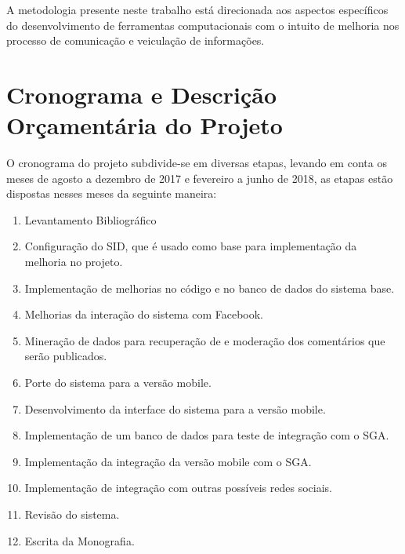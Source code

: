 \documentclass[
	12pt,				%
	openright,			%
	oneside,			%
	a4paper,			%
	english,			%
	french,				%
	spanish,			%
	brazil,				%
	]{abntex2}
\begin{document}
	A metodologia presente neste trabalho está direcionada aos aspectos específicos	do desenvolvimento de ferramentas computacionais com o intuito de melhoria nos processo de comunicação e veiculação de informações.
	
\section*{Cronograma e Descrição Orçamentária do Projeto}
	 O cronograma do projeto subdivide-se em diversas etapas, levando em conta os meses de agosto a dezembro de 2017 e fevereiro a junho de 2018, as etapas estão dispostas nesses meses da seguinte maneira:

	\begin{enumerate}[label=\Roman*)]
	\item Levantamento Bibliográfico
	
	\item Configuração do SID, que é usado como base para implementação da melhoria no projeto.
	
	\item Implementação de melhorias no código e no banco de dados do sistema base.
	
	\item Melhorias da interação do sistema com Facebook.
	
	\item Mineração de dados para recuperação de e moderação dos comentários que serão publicados.
	
	\item Porte do sistema para a versão mobile.
	
	\item Desenvolvimento da interface do sistema para a versão mobile.
	
	\item Implementação de um banco de dados para teste de integração com o SGA.
	
	\item Implementação da integração da versão mobile com o SGA.
	
	\item Implementação de integração com outras possíveis redes sociais.
	
	\item Revisão do sistema.
	
	\item Escrita da Monografia.
	
	\end{enumerate}
\end{document}
